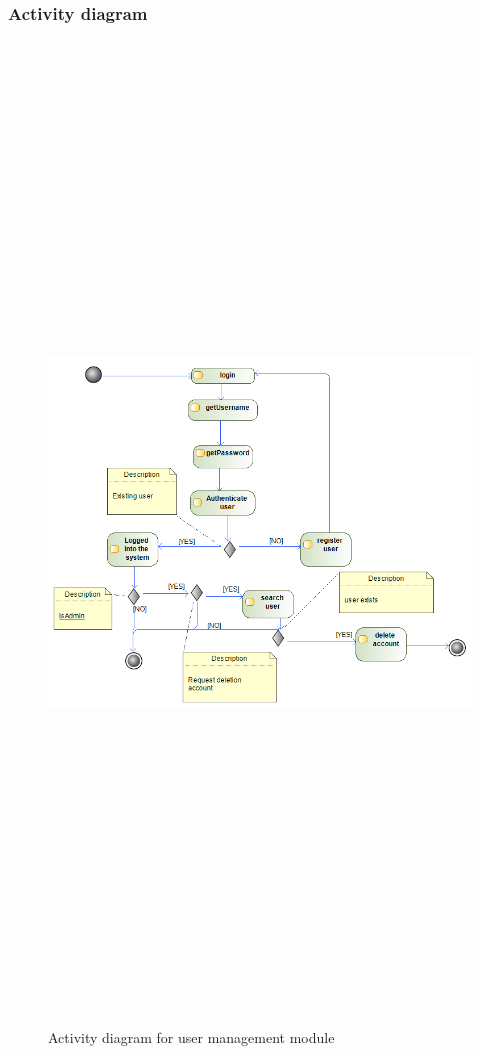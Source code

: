 \subsubsection{Activity diagram}
\begin{figure}[H]
	\includegraphics[width=12cm,height=26cm,keepaspectratio]{Users/Pictures/user_Activity_diagram.png}
	\caption{Activity diagram for user management module}\label{visina8}
\end{figure}
